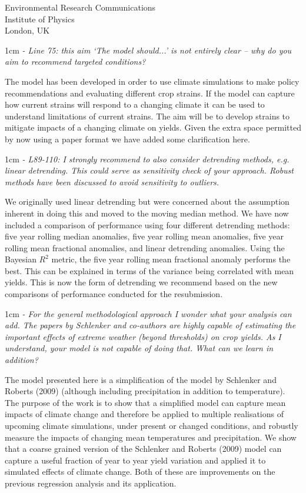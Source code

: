 \documentclass{letter}
\newcommand{\review}[1]{   
    \begin{adjustwidth}{1cm}{}
    \em{#1}
    \end{adjustwidth}
    }
\begin{document}
\begin{letter}{Environmental Research Communications \\ Institute of Physics \\ London, UK}
\review{
- Line 75: this aim `The model should...' is not entirely clear – why do you aim to recommend targeted conditions?
}

The model has been developed in order to use climate simulations to make policy recommendations and evaluating different crop strains. If the model can capture how current strains will respond to a changing climate it can be used to understand limitations of current strains. The aim will be to develop strains to mitigate impacts of a changing climate on yields. Given the extra space permitted by now using a paper format we have added some clarification here.

\review{
- L89-110: I strongly recommend to also consider detrending methods, e.g. linear detrending. This could serve as sensitivity check of your approach. Robust methods have been discussed to avoid sensitivity to outliers.
}

We originally used linear detrending but were concerned about the assumption inherent in doing this and moved to the moving median method. We have now included a comparison of performance using four different detrending methods: five year rolling median anomalies, five year rolling mean anomalies, five year rolling mean fractional anomalies, and linear detrending anomalies. Using the Bayesian $R^2$ metric, the five year rolling mean fractional anomaly performs the best. This can be explained in terms of the variance being correlated with mean yields. This is now the form of detrending we recommend based on the new comparisons of performance conducted for the resubmission.

\review{
- For the general methodological approach I wonder what your analysis can add. The papers by Schlenker and co-authors are highly capable of estimating the important effects of extreme weather (beyond thresholds) on crop yields. As I understand, your model is not capable of doing that. What can we learn in addition?
}

The model presented here is a simplification of the model by Schlenker and Roberts (2009) (although including precipitation in addition to temperature). The purpose of the work is to show that a simplified model can capture mean impacts of climate change and therefore be applied to multiple realisations of upcoming climate simulations, under present or changed conditions, and robustly measure the impacts of changing mean temperatures and precipitation. We show that a coarse grained version of the Schlenker and Roberts (2009) model can capture a useful fraction of year to year yield variation and applied it to simulated effects of climate change. Both of these are improvements on the previous regression analysis and its application.


\end{letter}
\end{document}
